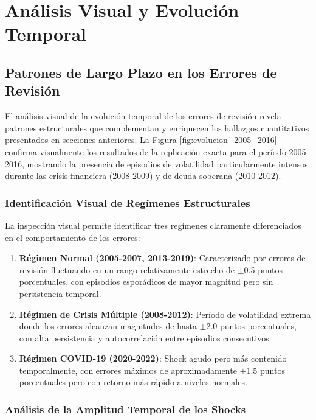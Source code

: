\documentclass{article}
\begin{document}
\section{Análisis Visual y Evolución Temporal}

\subsection{Patrones de Largo Plazo en los Errores de Revisión}

El análisis visual de la evolución temporal de los errores de revisión revela patrones estructurales que complementan y enriquecen los hallazgos cuantitativos presentados en secciones anteriores. La Figura \ref{fig:evolucion_2005_2016} confirma visualmente los resultados de la replicación exacta para el período 2005-2016, mostrando la presencia de episodios de volatilidad particularmente intensos durante las crisis financiera (2008-2009) y de deuda soberana (2010-2012).

\subsubsection{Identificación Visual de Regímenes Estructurales}

La inspección visual permite identificar tres regímenes claramente diferenciados en el comportamiento de los errores:

\begin{enumerate}
\item \textbf{Régimen Normal (2005-2007, 2013-2019)}: Caracterizado por errores de revisión fluctuando en un rango relativamente estrecho de $\pm$0.5 puntos porcentuales, con episodios esporádicos de mayor magnitud pero sin persistencia temporal.

\item \textbf{Régimen de Crisis Múltiple (2008-2012)}: Período de volatilidad extrema donde los errores alcanzan magnitudes de hasta $\pm$2.0 puntos porcentuales, con alta persistencia y autocorrelación entre episodios consecutivos.

\item \textbf{Régimen COVID-19 (2020-2022)}: Shock agudo pero más contenido temporalmente, con errores máximos de aproximadamente $\pm$1.5 puntos porcentuales pero con retorno más rápido a niveles normales.
\end{enumerate}

\subsubsection{Análisis de la Amplitud Temporal de los Shocks}
\end{document}
